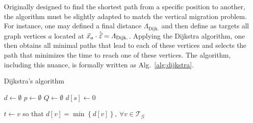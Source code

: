 Originally designed to find the shortest path from a specific position to another, the algorithm must be slightly adapted to match the vertical migration problem.
For instance, one may defined a final distance $\varLambda_{\mathrm{Dijk.}}$ and then define as targets all graph vertices $a$ located at $\vec{x}_a \cdot \hat{\vec{z}} = \varLambda_{\mathrm{Dijk.}}$.
Applying the Dijkstra algorithm, one then obtains all minimal paths that lead to each of these vertices and selects the path that minimizes the time to reach one of these vertices.
The algorithm, including this nuance, is formally written as Alg.~\ref{alg:dijkstra}.
\newcommand{\forcond}{$i=0$ \KwTo $n$}
\begin{algorithm}[hbt!]
	\caption{Dijkstra's algorithm \citep{dijkstra1959note}}\label{alg:dijkstra}
	
	$d \gets \emptyset$ 
	$p \gets \emptyset$ 
	$Q \gets \emptyset$ 
	$d[s] \gets 0$\;
	
	$t \gets v$ so that $d[v] = \min \left\{ d[v] \right\}, ~ \forall v \in \mathcal{T}_{\mathcal{G}}$\;
\end{algorithm}

